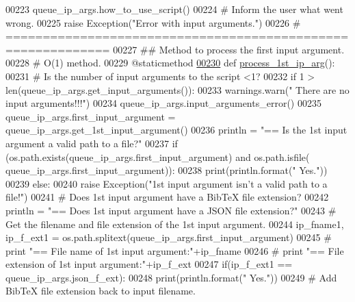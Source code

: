 \begin{DoxyCode}
00223         queue\_ip\_args.how\_to\_use\_script()
00224         \textcolor{comment}{# Inform the user what went wrong.}
00225         \textcolor{keywordflow}{raise} Exception(\textcolor{stringliteral}{"Error with input arguments."})
00226     \textcolor{comment}{# ============================================================}
00227     \textcolor{comment}{##  Method to process the first input argument.}
00228     \textcolor{comment}{#   O(1) method.}
00229     @staticmethod
\hypertarget{queue__ip__arguments_8py_source_l00230}{}\hyperlink{classutilities_1_1queue__ip__arguments_1_1queue__ip__args_ae1fc6d7af2e429d0656dbf388711db94}{00230}     \textcolor{keyword}{def }\hyperlink{classutilities_1_1queue__ip__arguments_1_1queue__ip__args_ae1fc6d7af2e429d0656dbf388711db94}{process\_1st\_ip\_arg}():
00231         \textcolor{comment}{#   Is the number of input arguments to the script <1?}
00232         \textcolor{keywordflow}{if} 1 > len(queue\_ip\_args.get\_input\_arguments()):
00233             warnings.warn(\textcolor{stringliteral}{" There are no input arguments!!!"})
00234             queue\_ip\_args.input\_arguments\_error()
00235         queue\_ip\_args.first\_input\_argument = queue\_ip\_args.get\_1st\_input\_argument()
00236         println = \textcolor{stringliteral}{"==   Is the 1st input argument a valid path to a file?"}
00237         \textcolor{keywordflow}{if} (os.path.exists(queue\_ip\_args.first\_input\_argument) \textcolor{keywordflow}{and} os.path.isfile(
      queue\_ip\_args.first\_input\_argument)):
00238             print(println.format(\textcolor{stringliteral}{"  Yes."}))
00239         \textcolor{keywordflow}{else}:
00240             \textcolor{keywordflow}{raise} Exception(\textcolor{stringliteral}{"1st input argument isn't a valid path to a file!"})
00241         \textcolor{comment}{#   Does 1st input argument have a BibTeX file extension?}
00242         println = \textcolor{stringliteral}{"==   Does 1st input argument have a JSON file extension?"}
00243         \textcolor{comment}{#   Get the filename and file extension of the 1st input argument.}
00244         ip\_fname1, ip\_f\_ext1 = os.path.splitext(queue\_ip\_args.first\_input\_argument)
00245 \textcolor{comment}{#   print "==   File name of 1st input argument:"+ip\_fname}
00246 \textcolor{comment}{#   print "==   File extension of 1st input argument:"+ip\_f\_ext}
00247         if(ip\_f\_ext1 == queue\_ip\_args.json\_f\_ext):
00248             print(println.format(\textcolor{stringliteral}{"  Yes."}))
00249             \textcolor{comment}{#   Add BibTeX file extension back to input filename.}

\end{DoxyCode}
